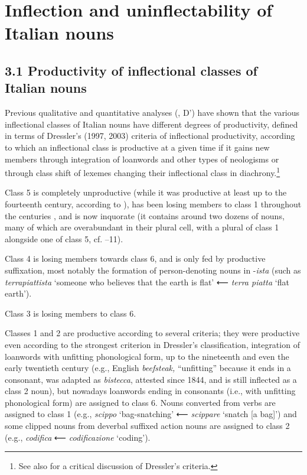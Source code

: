\documentclass[output=paper]{langscibook}
\begin{document}
\section{Inflection and uninflectability of Italian nouns} 
\subsection{3.1 Productivity of inflectional classes of Italian nouns}

Previous qualitative and quantitative analyses (\citealt{DresslerThornton1996}, D’\citealt{AchilleThornton2003}) have shown that the various inflectional classes of Italian nouns have different degrees of productivity, defined in terms of Dressler’s (1997, 2003) criteria of inflectional productivity, according to which an inflectional class is productive at a given time if it gains new members through integration of loanwords and other types of neologisms or through class shift of lexemes changing their inflectional class in diachrony.\footnote{See also \citet{Gardani2013} for a critical discussion of Dressler’s criteria.}

Class 5 is completely unproductive (while it was productive at least up to the fourteenth century, according to \citealt{Gardani2013}), has been losing members to class 1 throughout the centuries \citep{Santangelo1981}, and is now inquorate (it contains around two dozens of nouns, many of which are overabundant in their plural cell, with a plural of class 1 alongside one of class 5, cf. \citealt{Thornton2010}–11).

Class 4 is losing members towards class 6, and is only fed by productive suffixation, most notably the formation of person-denoting nouns in \nobreakdash-\textit{ista} (such as \textit{terrapiattista} ‘someone who believes that the earth is flat’ ⟵ \textit{terra piatta} ‘flat earth’).

Class 3 is losing members to class 6.

Classes 1 and 2 are productive according to several criteria; they were productive even according to the strongest criterion in Dressler’s classification, integration of loanwords with unfitting phonological form, up to the nineteenth and even the early twentieth century (e.g., English \textit{beefsteak,} “unfitting” because it ends in a consonant, was adapted as \textit{bistecca}, attested since 1844, and is still inflected as a class 2 noun), but nowadays loanwords ending in consonants (i.e., with unfitting phonological form) are assigned to class 6. Nouns converted from verbs are assigned to class 1 (e.g., \textit{scippo} ‘bag-snatching’ ⟵ \textit{scippare} ‘snatch [a bag]’) and some clipped nouns from deverbal suffixed action nouns are assigned to class 2 (e.g., \textit{codifica} ⟵ \textit{codificazione} ‘coding’).
\end{document}
